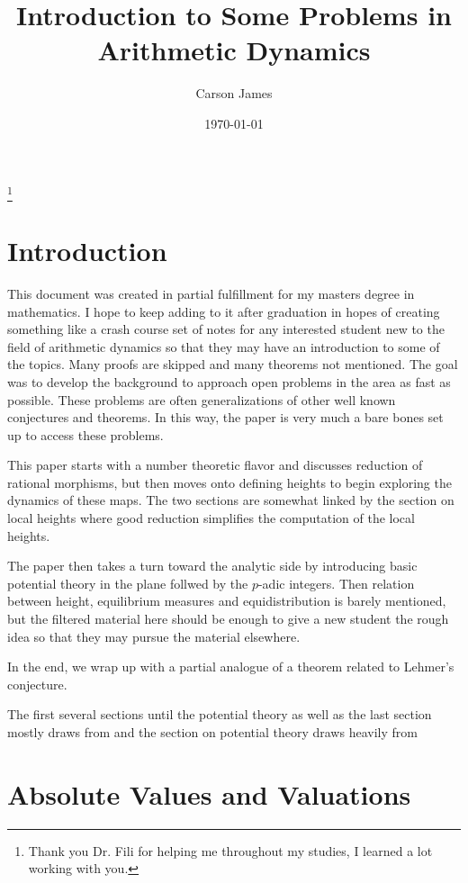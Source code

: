 \documentclass[12pt]{amsart}
\title[Creative Component]{Introduction to Some Problems in Arithmetic Dynamics}
\author[James]{Carson James}
\date{\today}
\theoremstyle{definition}
\theoremstyle{remark}
\theoremstyle{definition}
\begin{document}
\maketitle
\newpage
\thanks{Thank you Dr. Fili for helping me throughout my studies, I learned a lot working with you.}

\tableofcontents

\section{Introduction}
This document was created in partial fulfillment for my masters degree in mathematics. I hope to keep adding to it after graduation in hopes of creating something like a crash course set of notes for any interested student new to the field of arithmetic dynamics so that they may have an introduction to some of the topics. Many proofs are skipped and many theorems not mentioned. The goal was to develop the background to approach open problems in the area as fast as possible. These problems are often generalizations of other well known conjectures and theorems. In this way, the paper is very much a bare bones set up to access these problems.

This paper starts with a number theoretic flavor and discusses reduction of rational morphisms, but then moves onto defining heights to begin exploring the dynamics of these maps. The two sections are somewhat linked by the section on local heights where good reduction simplifies the computation of the local heights.

The paper then takes a turn toward the analytic side by introducing basic potential theory in the plane follwed by the $p$-adic integers. Then relation between height, equilibrium measures and equidistribution is barely mentioned, but the filtered material here should be enough to give a new student the rough idea so that they may pursue the material elsewhere.

In the end, we wrap up with a partial analogue of a theorem related to Lehmer's conjecture.

The first several sections until the potential theory as well as the last section mostly draws from \cite{ADS}
and the section on potential theory draws heavily from \cite{PT}



\section{Absolute Values and Valuations}
\end{document}
